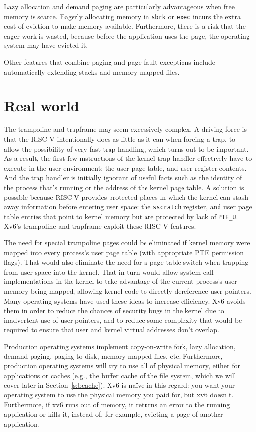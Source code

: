 Lazy allocation and demand paging are particularly advantageous when
free memory is scarce.
Eagerly allocating memory in
\lstinline{sbrk} or \lstinline{exec}
incurs the extra cost of eviction to make memory available.
Furthermore, there is a risk that the eager work is wasted, because
before the application uses the page, the operating system may have
evicted it.

Other features that combine paging and page-fault exceptions include
automatically extending stacks and memory-mapped files.

\section{Real world}

The trampoline and trapframe may seem excessively complex. A driving
force is that the RISC-V intentionally does as little as it can when
forcing a trap, to allow the possibility of very fast trap handling,
which turns out to be important. As a result, the first few
instructions of the kernel trap handler effectively have to execute in
the user environment: the user page table, and user register contents.
And the trap handler is initially ignorant of useful facts such as the
identity of the process that's running or the address of the kernel
page table. A solution is possible because RISC-V provides protected
places in which the kernel can stash away information before entering
user space: the {\tt sscratch} register, and user page table entries
that point to kernel memory but are protected by lack of \lstinline{PTE_U}.
Xv6's trampoline and trapframe exploit these RISC-V features.

The need for special trampoline pages could be eliminated if kernel
memory were mapped into every process's user page table (with
appropriate PTE permission flags). That would
also eliminate the need for a page table switch when trapping from
user space into the kernel. That in turn would allow system call
implementations in the kernel to take advantage of the current
process's user memory being mapped, allowing kernel code to directly
dereference user pointers. Many operating systems have used these ideas to
increase efficiency. Xv6 avoids them in order to reduce the chances of
security bugs in the kernel due to inadvertent use of user pointers,
and to reduce some complexity that would be required to ensure that
user and kernel virtual addresses don't overlap.

Production operating systems implement copy-on-write fork, lazy
allocation, demand paging, paging to disk, memory-mapped files, etc.
Furthermore, production operating systems will try to use all of
physical memory, either for applications or caches (e.g., the buffer
cache of the file system, which we will cover later in
Section~\ref{s:bcache}). Xv6 is na\"{i}ve in this regard: you want
your operating system to use the physical memory you paid for, but xv6
doesn't. Furthermore, if xv6 runs out of memory, it returns an error to
the running application or kills it, instead of, for example, evicting
a page of another application.

